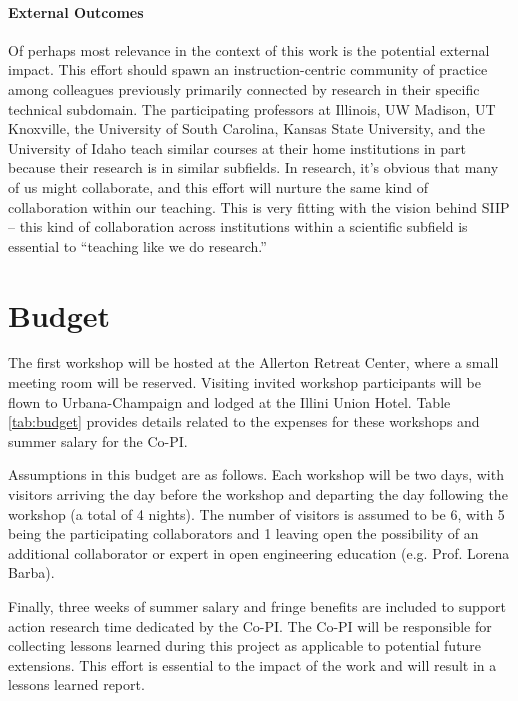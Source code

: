 \documentclass[11pt]{article}
\begin{document}
          \paragraph{External Outcomes} Of perhaps most relevance in the
          context of this work is the potential external impact. This effort
          should spawn an instruction-centric community of practice among
          colleagues previously primarily connected by research 
          in their specific technical subdomain. 
          The participating professors at Illinois, UW Madison, UT Knoxville, 
          the University of South Carolina, Kansas State University, and the 
          University of Idaho teach similar courses at their home institutions 
          in part because their research is in similar subfields. In research, 
          it's obvious that many of us might collaborate, and this effort will 
          nurture the same kind of collaboration within our teaching. This is 
          very fitting with the vision behind SIIP -- this kind of collaboration 
          across institutions within a scientific subfield is essential to 
          ``teaching like we do research.'' 

          \section{Budget}
          The first workshop will be hosted at the Allerton Retreat Center, 
          where a small meeting room will be reserved. Visiting 
          invited workshop participants will be flown to Urbana-Champaign and 
          lodged at the Illini Union Hotel. Table \ref{tab:budget} provides 
          details related to the expenses for these workshops and summer salary 
          for the Co-PI.

          Assumptions in this budget are as follows. Each workshop will be two 
          days, with visitors arriving the day before the workshop and 
          departing the day following the workshop (a total of 4 nights). The 
          number of visitors is assumed to be 6, with 5 being the participating 
          collaborators and 1 leaving open the possibility of an additional 
          collaborator or expert in open engineering education (e.g. Prof. 
          Lorena Barba). 
          
          Finally, three weeks of summer salary and fringe 
          benefits are included to support action research time dedicated by 
          the Co-PI. The Co-PI will be responsible for collecting lessons 
          learned during this project as applicable to potential future 
          extensions. This effort is essential to the impact of the work and 
          will result in a lessons learned report.
\end{document}
